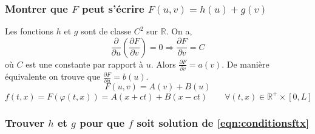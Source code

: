 \documentclass[12pt]{article}
\begin{document}
\subsubsection{Montrer que $F$ peut s'écrire $F(u,v)=h(u)+g(v)$}
\noindent Les fonctions $h$ et $g$ sont de classe $C^2$ sur $\mathbb{R}$. On a,
\begin{equation*}
	\frac{\partial}{\partial u}\left( \frac{\partial F}{\partial v} \right)=0 \Longrightarrow \frac{\partial F}{\partial v} =C
\end{equation*}
où $C$ est une constante par rapport à $u$. Alors $\frac{\partial F}{\partial v}=a(v)$. De manière équivalente on trouve que $\frac{\partial F}{\partial u}=b(u)$.
\begin{equation*}
	F(u,v)=A(v)+B(u)
\end{equation*}
\begin{equation*}
	f(t,x)=F(\varphi(t,x))=A(x+ct)+B(x-ct)\qquad \forall(t,x) \in \mathbb{R}^+ \times [0,L]
\end{equation*}
\subsubsection{Trouver $h$ et $g$ pour que $f$ soit solution de \eqref{eqn:conditionsftx}}
\end{document}
